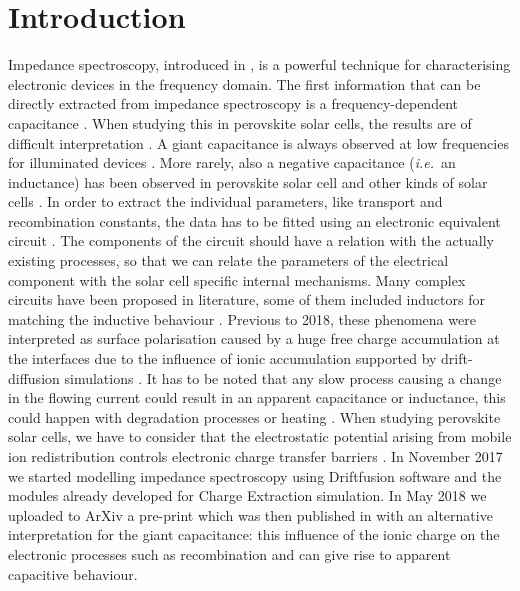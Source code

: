 
\section{Introduction}
	Impedance spectroscopy, introduced in , is a powerful technique for characterising electronic devices in the frequency domain.
	The first information that can be directly extracted from impedance spectroscopy is a frequency\hyp{}dependent capacitance \cite{Brus2016}.
	When studying this in perovskite solar cells, the results are of difficult interpretation \cite{Almora2018,Guillen2014}.
	A giant capacitance is always observed at low frequencies for illuminated devices \cite{Juarez-Perez2014,Kim2015c}.
	More rarely, also a negative capacitance (\textsl{i.e.}\ an inductance) has been observed in perovskite solar cell \cite{Ghahremanirad2017,Guerrero2016,Sanchez2014} and other kinds of solar cells \cite{Mora-Sero2006,Knapp2015}.
	In order to extract the individual parameters, like transport and recombination constants, the data has to be fitted using an electronic equivalent circuit \cite{Jamnik2001}.
	The components of the circuit should have a relation with the actually existing processes, so that we can relate the parameters of the electrical component with the solar cell specific internal mechanisms.
	Many complex circuits have been proposed in literature, some of them included inductors for matching the inductive behaviour \cite{Almora2018,Ghahremanirad2017,Guerrero2016}.
	Previous to 2018, these phenomena were interpreted as surface polarisation caused by a huge free charge accumulation at the interfaces due to the influence of ionic accumulation \cite{Guerrero2016,Zarazua2016a} supported by drift\hyp{}diffusion simulations \cite{Garcia-Rosell2018,Lopez-Varo2018}.
	It has to be noted that any slow process causing a change in the flowing current could result in an apparent capacitance or inductance, this could happen with degradation processes or heating \cite{Knapp2015,Shimizu2017}.
	When studying perovskite solar cells, we have to consider that the electrostatic potential arising from mobile ion redistribution controls electronic charge transfer barriers \cite{Tress2016,Pockett2017}.
	In November 2017 we started modelling impedance spectroscopy using Driftfusion software and the modules already developed for Charge Extraction simulation.
	In May 2018 we uploaded to ArXiv a pre-print which was then published in  with an alternative interpretation for the giant capacitance: this influence of the ionic charge on the electronic processes such as recombination and can give rise to apparent capacitive behaviour.
